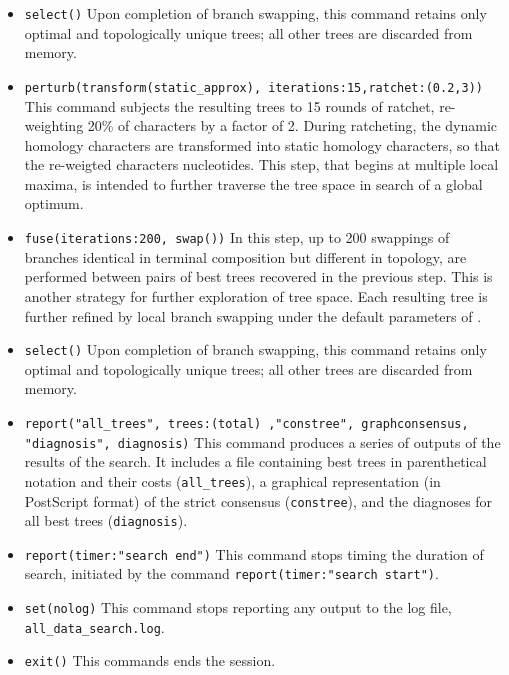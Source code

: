 \begin{itemize}
\item \texttt{select()} Upon completion of branch swapping, this command retains only optimal and topologically unique trees; all other trees are discarded from memory. 
\item \texttt{perturb(transform(static\_approx), iterations:15,ratchet:(0.2,3))} This command subjects the resulting trees to 15 rounds of ratchet, re-weighting 20\% of characters by a factor of 2. During ratcheting, the dynamic homology characters are transformed into static homology characters, so that the re-weigted characters nucleotides. This step, that begins at multiple local maxima, is intended to further traverse the tree space in search of a global optimum.
\item \texttt{fuse(iterations:200, swap())} In this step, up to 200 swappings of branches identical in terminal composition but different in topology, are performed between pairs of best trees recovered in the previous step. This is another strategy for further exploration of tree space. Each resulting tree is further refined by local branch swapping under the default parameters of .
\item \texttt{select()} Upon completion of branch swapping, this command retains only optimal and topologically unique trees; all other trees are discarded from memory.
\item \texttt{report("all\_trees", trees:(total) ,"constree", graphconsensus, "diagnosis", diagnosis)} This command produces a series of outputs of the results of the search. It includes a file containing best trees in parenthetical notation and their costs (\texttt{all\_trees}), a graphical representation (in PostScript format) of the strict consensus (\texttt{constree}), and the diagnoses for all best trees (\texttt{diagnosis}).
\item \texttt{report(timer:"search end")} This command stops timing the duration of search, initiated by the command \texttt{report(timer:"search start")}.
\item \texttt{set(nolog)} This command stops reporting any output to the log file, \texttt{all\_data\_search.log}.
\item \texttt{exit()} This commands ends the \poy session.
\end{itemize}

